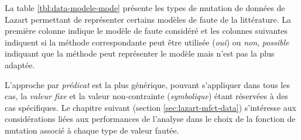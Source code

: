                 La table \ref{tbl:data-modele-mode} présente les types de mutation de données de Lazart permettant de représenter certains modèles de faute de la littérature.
                La première colonne indique le modèle de faute considéré et les colonnes suivantes indiquent si la méthode correspondante peut être utilisée (\textit{oui}) ou \textit{non}, \textit{possible} indiquant que la méthode peut représenter le modèle mais n'est pas la plus adaptée. 
                
                L'approche par \textit{prédicat} est la plus générique, pouvant s'appliquer dans tous les cas, la \textit{valeur fixe} et la valeur non-contrainte (\textit{symbolique}) étant réservées à des cas spécifiques.
                Le chapitre suivant (section \ref{sec:lazart-mfct-data}) s'intéresse aux considérations liées aux performances de l'analyse dans le choix de la fonction de mutation associé à chaque type de valeur fautée.
                
